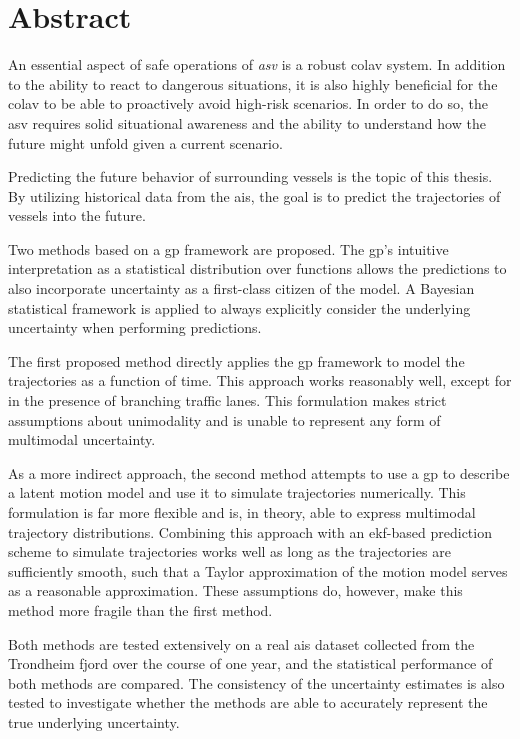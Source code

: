 \chapter*{Abstract}
An essential aspect of safe operations of \textit{\acrfull{asv}} is a robust \acrfull{colav} system. In addition to the ability to react to dangerous situations, it is also highly beneficial for the \acrshort{colav} to be able to proactively avoid high-risk scenarios. In order to do so, the \acrshort{asv} requires solid situational awareness and the ability to understand how the future might unfold given a current scenario. 

Predicting the future behavior of surrounding vessels is the topic of this thesis. By utilizing historical data from the \acrfull{ais}, the goal is to predict the trajectories of vessels into the future. 

Two methods based on a \acrfull{gp} framework are proposed. The \acrshort{gp}'s intuitive interpretation as a statistical distribution over functions allows the predictions to also incorporate uncertainty as a first-class citizen of the model. A Bayesian statistical framework is applied to always explicitly consider the underlying uncertainty when performing predictions. 

The first proposed method directly applies the \acrshort{gp} framework to model the trajectories as a function of time. This approach works reasonably well, except for in the presence of branching traffic lanes. This formulation makes strict assumptions about unimodality and is unable to represent any form of multimodal uncertainty.

As a more indirect approach, the second method attempts to use a \acrshort{gp} to describe a latent motion model and use it to simulate trajectories numerically. This formulation is far more flexible and is, in theory, able to express multimodal trajectory distributions. Combining this approach with an \acrfull{ekf}-based prediction scheme to simulate trajectories works well as long as the trajectories are sufficiently smooth, such that a Taylor approximation of the motion model serves as a reasonable approximation. These assumptions do, however, make this method more fragile than the first method.

Both methods are tested extensively on a real \acrshort{ais} dataset collected from the Trondheim fjord over the course of one year, and the statistical performance of both methods are compared. The consistency of the uncertainty estimates is also tested to investigate whether the methods are able to accurately represent the true underlying uncertainty.